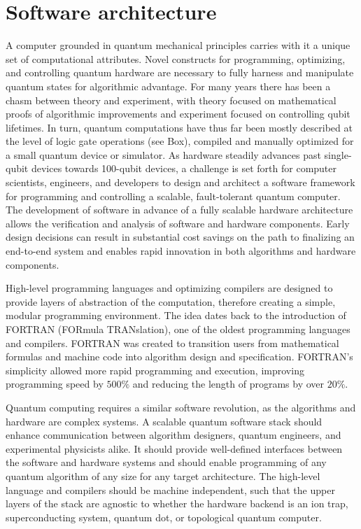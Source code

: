 \documentclass[journal]{IEEEtran}
\begin{document}
\section{Software architecture}

A computer grounded in quantum mechanical principles carries with it a unique set of computational attributes.  Novel constructs for programming, optimizing, and controlling quantum hardware are necessary to fully harness and manipulate quantum states for algorithmic advantage.
For many years there has been a chasm between theory and experiment, with theory  focused on mathematical proofs of algorithmic improvements and experiment focused on controlling qubit lifetimes.  In turn, quantum computations have thus far been mostly described at the level of logic gate operations (see Box), compiled and manually optimized for a small quantum device or simulator.
As hardware steadily advances past single-qubit devices towards 100-qubit devices, a challenge is set forth for computer scientists, engineers, and developers to design and architect a software framework for programming and controlling a scalable, fault-tolerant quantum computer.
The development of software in advance of a fully scalable hardware architecture allows the verification and analysis of software and hardware components.  Early design decisions can result in substantial cost savings on the path to finalizing an end-to-end system and enables rapid innovation in both algorithms and hardware components.

High-level programming languages and optimizing compilers are designed to provide layers of abstraction of the computation, therefore creating a simple, modular programming environment.
The idea dates back to the introduction of FORTRAN \cite{} (FORmula TRANslation), one of the oldest programming languages and compilers.  FORTRAN was created to transition users from mathematical formulas and machine code into algorithm design and specification.  FORTRAN's simplicity allowed more rapid programming and execution, improving programming speed by $500\%$ and reducing the length of programs by over $20\%$. 

Quantum computing requires a similar software revolution, as the algorithms and hardware are complex systems.
A scalable quantum software stack should enhance communication between algorithm designers, quantum engineers, and experimental physicists alike.
It should provide well-defined interfaces between the software and hardware systems and should enable programming of any quantum algorithm of any size for any target architecture.
The high-level language and compilers should be machine independent, such that the upper layers of the stack are agnostic to whether the hardware backend is an ion trap, superconducting system, quantum dot, or topological quantum computer.
\end{document}
